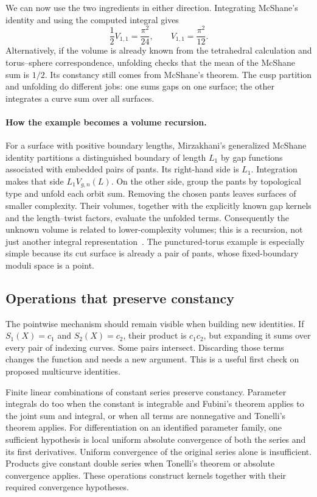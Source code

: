 We can now use the two ingredients in either direction.
Integrating McShane's identity and using the computed integral
gives
\[
 \frac12 V_{1,1}=\frac{\pi^2}{24},
 \qquad V_{1,1}=\frac{\pi^2}{12}.
\]
Alternatively, if the volume is already known from the
tetrahedral calculation and torus--sphere correspondence,
unfolding checks that the mean of the McShane sum is $1/2$.
Its constancy still comes from McShane's theorem.
The cusp partition and unfolding do different jobs:
one sums gaps on one surface; the other integrates a curve
sum over all surfaces.

\paragraph{How the example becomes a volume recursion.}
For a surface with positive boundary lengths, Mirzakhani's
generalized McShane identity partitions a distinguished
boundary of length $L_1$ by gap functions associated with
embedded pairs of pants. Its right-hand side is $L_1$.
Integration makes that side $L_1V_{g,n}(L)$.
On the other side, group the pants by topological type and
unfold each orbit sum. Removing the chosen pants leaves
surfaces of smaller complexity. Their volumes, together with
the explicitly known gap kernels and the length--twist
factors, evaluate the unfolded terms.
Consequently the unknown volume is related to lower-complexity
volumes; this is a recursion, not just another integral
representation~\cite[Section 8]{MirzVolumes}.
The punctured-torus example is especially simple because its
cut surface is already a pair of pants, whose fixed-boundary
moduli space is a point.

\subsection{Operations that preserve constancy}

The pointwise mechanism should remain visible when building new
identities. If $S_1(X)=c_1$ and $S_2(X)=c_2$, their product is
$c_1c_2$, but expanding it sums over every pair of indexing curves.
Some pairs intersect. Discarding those terms changes the function
and needs a new argument. This is a useful first check on proposed
multicurve identities.

Finite linear combinations of constant series preserve constancy.
Parameter integrals do too when the constant is integrable and Fubini's
theorem applies to the joint sum and integral, or when all terms are
nonnegative and Tonelli's theorem applies. For differentiation on an
identified parameter family, one sufficient hypothesis is local uniform
absolute convergence of both the series and its first derivatives.
Uniform convergence of the original series alone is insufficient.
Products give constant double series when Tonelli's theorem or absolute
convergence applies. These operations construct kernels together with
their required convergence hypotheses.

